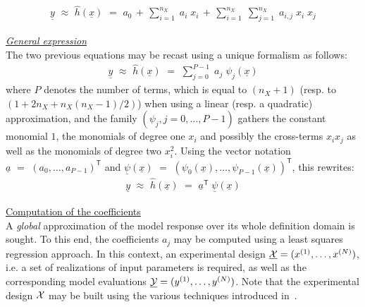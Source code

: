 {  \begin{align*}
    \underline{y} \, \, \approx \, \, \widehat{h}(\underline{x}) \, \, = \, \, a_0 \, + \,  \sum_{i=1}^{n_{X}} \; a_{i} \; x_i \, + \,
    \sum_{i=1}^{n_{X}} \; \sum_{j=1}^{n_{X}} \; a_{i,j} \; x_i \; x_j
  \end{align*}

  \underline{\textit{General expression}}\\

  The two previous equations may be recast using a unique formalism as follows:
  \begin{align*}
    \underline{y} \, \, \approx \, \, \widehat{h}(\underline{x}) \, \, = \, \, \sum_{j=0}^{P-1} \; a_j \; \psi_j(\underline{x})
  \end{align*}
  where $P$ denotes the number of terms, which is equal to $(n_X + 1)$ (resp. to $(1 + 2n_X + n_X (n_X - 1)/2)$) when using a linear (resp. a quadratic) approximation, and the family $(\psi_j,j=0,\dots,P-1)$ gathers the constant monomial $1$, the monomials of degree one $x_i$ and possibly the cross-terms $x_i x_j$ as well as the monomials of degree two $x_i^2$. Using the vector notation $\underline{a} \, \, = \, \, (a_{0} , \dots , a_{P-1} )^{\textsf{T}}$ and $\underline{\psi}(\underline{x}) \, \, = \, \, (\psi_{0}(\underline{x}) , \dots , \psi_{P-1}(\underline{x}) )^{\textsf{T}}$, this rewrites:
  \begin{align*}
    \underline{y} \, \, \approx \, \, \widehat{h}(\underline{x}) \, \, = \, \, \underline{a}^{\textsf{T}} \; \underline{\psi}(\underline{x})
  \end{align*}

  \underline{Computation of the coefficients}\\

  A \emph{global} approximation of the model response over its whole definition domain is sought. To this end, the coefficients $a_j$ may be computed using a least squares regression approach. In this context, an experimental design $\underline{{\mathcal X}} =(x^{(1)},\dots,x^{(N)})$, i.e. a set of realizations of input parameters is required, as well as the corresponding model evaluations $\underline{{\mathcal Y}} =(y^{(1)},\dots,y^{(N)})$. Note that the experimental design ${\mathcal X}$ may be built using the various techniques introduced in~. \\

}
